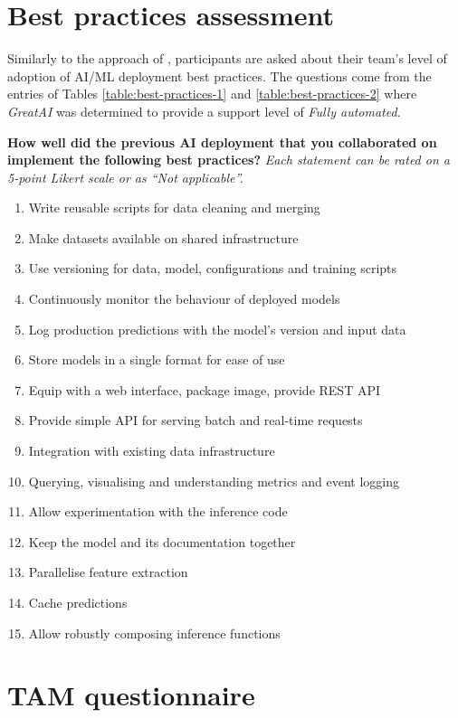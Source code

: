 \appendix

\chapter{Best practices assessment} \label{appendix:practices}

Similarly to the approach of \cite{serban2020adoption}, participants are asked about their team's level of adoption of AI/ML deployment best practices. The questions come from the entries of Tables \ref{table:best-practices-1} and \ref{table:best-practices-2} where \textit{GreatAI} was determined to provide a support level of \textit{Fully automated}.

\textbf{How well did the previous AI deployment that you collaborated on implement the following best practices?} \textit{Each statement can be rated on a 5-point Likert scale or as ``Not applicable''.}

\begin{enumerate}
\item Write reusable scripts for data cleaning and merging
\item Make datasets available on shared infrastructure
\item Use versioning for data, model, configurations and training scripts
\item Continuously monitor the behaviour of deployed models
\item Log production predictions with the model's version and input data
\item Store models in a single format for ease of use
\item Equip with a web interface, package image, provide REST API
\item Provide simple API for serving batch and real-time requests
\item Integration with existing data infrastructure
\item Querying, visualising and understanding metrics and event logging
\item Allow experimentation with the inference code
\item Keep the model and its documentation together
\item Parallelise feature extraction
\item Cache predictions
\item Allow robustly composing inference functions
\end{enumerate}

\chapter{TAM questionnaire} \label{appendix:questions}

